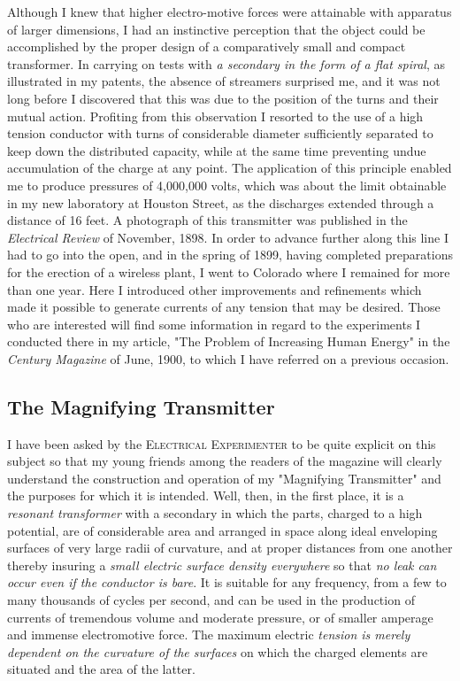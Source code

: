 \documentclass[a4paper,12pt,english,twoside,openright]{memoir}
\begin{document}
Although I knew that higher electro-motive forces were attainable with apparatus of larger 
dimensions, I had an instinctive perception that the object could be accomplished by the proper 
design of a comparatively small and compact transformer.  In carrying on tests with \emph{a secondary in the form of a flat spiral}, as illustrated in my patents, the absence of streamers surprised me, 
and it was not long before I discovered that this was due to the position of the turns and their 
mutual action.  Profiting from this observation I resorted to the use of a high tension conductor 
with turns of considerable diameter sufficiently separated to keep down the distributed capacity, 
while at the same time preventing undue accumulation of the charge at any point.  The 
application of this principle enabled me to produce pressures of 4,000,000 volts, which was about 
the limit obtainable in my new laboratory at Houston Street, as the discharges extended through a 
distance of 16 feet.  A photograph of this transmitter was published in the \emph{Electrical Review} of 
November, 1898.  In order to advance further along this line I had to go into the open, and in the spring of 1899, 
having completed preparations for the erection of a wireless plant, I went to Colorado where I 
remained for more than one year.  Here I introduced other improvements and refinements which 
made it possible to generate currents of any tension that may be desired.  Those who are 
interested will find some information in regard to the experiments I conducted there in my article, 
"The Problem of Increasing Human Energy" in the \emph{Century Magazine} of June, 1900, to which I 
have referred on a previous occasion.  

\subsection{The Magnifying Transmitter}
I have been asked by the \textsc{Electrical Experimenter} to be quite explicit on this subject so 
that my young friends among the readers of the magazine will clearly understand the construction 
and operation of my "Magnifying Transmitter" and the purposes for which it is intended.  Well, 
then, in the first place, it is a \emph{resonant transformer} with a secondary in which the parts, charged to 
a high potential, are of considerable area and arranged in space along ideal enveloping surfaces 
of very large radii of curvature, and at proper distances from one another thereby insuring a \emph{small 
electric surface density everywhere} so that \emph{no leak can occur even if the conductor is bare}.  It is 
suitable for any frequency, from a few to many thousands of cycles per second, and can be used 
in the production of currents of tremendous volume and moderate pressure, or of smaller 
amperage and immense electromotive force.  The maximum electric \emph{tension is merely dependent 
on the curvature of the surfaces} on which the charged elements are situated and the area of the 
latter.  
\end{document}

